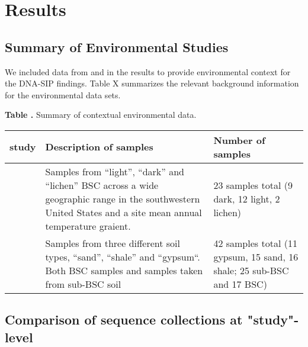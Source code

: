 \section{Results}
\subsection{Summary of Environmental Studies}
We included data from \citet{Garcia_Pichel_2013} and \citet{Steven_2013}
in the results to provide environmental context for the DNA-SIP
findings. Table X summarizes the relevant background information
for the environmental data sets.
\begin{table}

\textbf{
\label{table:study_summary}
Table .
}
{Summary of contextual environmental data.} 
{\centering
\begin{tabular}{lp{6cm}p{6cm}}
\toprule
study & Description of samples & Number of samples \\ 
\midrule
\citet{Garcia_Pichel_2013} & Samples from ``light'', ``dark'' and ``lichen''
BSC across a wide geographic range in the southwestern United States and a site
mean annual temperature graient. & 23 samples total (9 dark, 12 light, 2
lichen) \\ \midrule 
\citet{Steven_2013} & Samples from three different soil types, ``sand'',
``shale'' and ``gypsum``. Both BSC samples and samples taken from sub-BSC soil
& 42 samples total (11 gypsum, 15 sand, 16 shale; 25 sub-BSC and 17 BSC) \\
\bottomrule
\end{tabular}}{}
\end{table}

\subsection{Comparison of sequence collections at "study"-level}

